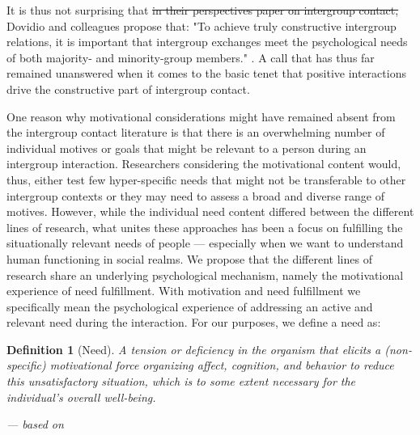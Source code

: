 \documentclass[man, 12pt, a4paper, mask]{apa7}
\theoremstyle{break}
\newtheorem{definition}{Definition}
\theoremstyle{plain}
\providecommand{\DIFdeltex}[1]{{\protect\color{red}\sout{#1}}}                      %
\providecommand{\DIFdelbegin}{} %
\providecommand{\DIFdelend}{} %
\providecommand{\DIFdel}[1]{\texorpdfstring{\DIFdeltex{#1}}{}} %
\newcommand{\DIFscaledelfig}{0.5}
\newlength{\DIFdelgraphicswidth} %
\newlength{\DIFdelgraphicsheight} %
\newcommand{\DIFdelincludegraphics}[2][]{%
\sbox{\DIFdelgraphicsbox}{\DIFOincludegraphics[#1]{#2}}%
\settoboxwidth{\DIFdelgraphicswidth}{\DIFdelgraphicsbox} %
\settoboxtotalheight{\DIFdelgraphicsheight}{\DIFdelgraphicsbox} %
\scalebox{\DIFscaledelfig}{%
\parbox[b]{\DIFdelgraphicswidth}{\usebox{\DIFdelgraphicsbox}\\[-\baselineskip] \rule{\DIFdelgraphicswidth}{0em}}\llap{\resizebox{\DIFdelgraphicswidth}{\DIFdelgraphicsheight}{%
\setlength{\unitlength}{\DIFdelgraphicswidth}%
\begin{picture}(1,1)%
\thicklines\linethickness{2pt} %
{\color[rgb]{1,0,0}\put(0,0){\framebox(1,1){}}}%
{\color[rgb]{1,0,0}\put(0,0){\line( 1,1){1}}}%
{\color[rgb]{1,0,0}\put(0,1){\line(1,-1){1}}}%
\end{picture}%
}\hspace*{3pt}}} %
} %
\DeclareRobustCommand{\DIFdelbegin}{\DIFOdelbegin \let\includegraphics\DIFdelincludegraphics} %
\DeclareRobustCommand{\DIFdelend}{\DIFOaddend \let\includegraphics\DIFOincludegraphics} %
\begin{document}
It is thus not surprising that \DIFdelbegin \DIFdel{in their perspectives paper on intergroup contact, }\DIFdelend Dovidio and colleagues propose that: "To achieve truly constructive intergroup relations, it is important that intergroup exchanges meet the psychological needs of both majority- and minority-group members." \citep[][p. 6]{Dovidio2017}. A call that has thus far remained unanswered when it comes to the basic tenet that positive interactions drive the constructive part of intergroup contact.

One reason why motivational considerations might have remained absent from the intergroup contact literature is that there is an overwhelming number of individual motives or goals that might be relevant to a person during an intergroup interaction. Researchers considering the motivational content would, thus, either test few hyper-specific needs that might not be transferable to other intergroup contexts or they may need to assess a broad and diverse range of motives. However, while the individual need content differed between the different lines of research, what unites these approaches has been a focus on fulfilling the situationally relevant needs of people --- especially when we want to understand human functioning in social realms. We propose that the different lines of research share an underlying psychological mechanism, namely the motivational experience of need fulfillment. With motivation and need fulfillment we specifically mean the psychological experience of addressing an active and relevant need during the interaction. For our purposes, we define a need as:

\begin{definition}[Need]\label{def:need}
A tension or deficiency in the organism that elicits a (non-specific) motivational force organizing affect, cognition, and behavior to reduce this unsatisfactory situation, which is to some extent necessary for the individual’s overall well-being.
\begin{flushright}
--- based on \citet[][]{dweck2017, Hull1943, Lewin1938, McClelland1987, Ryan2017, Steverink2006}
\end{flushright}
\end{definition}
\end{document}
